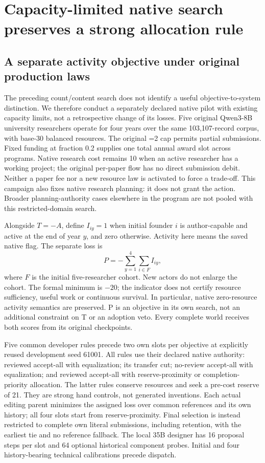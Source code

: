 \section{Capacity-limited native search preserves a strong allocation rule}
\label{sec:native-capacity}
\subsection{A separate activity objective under original production laws}
The preceding count/content search does not identify a useful objective-to-system
distinction. We therefore conduct a separately declared native pilot with
existing capacity limits, not a retrospective change of its losses. Five
original Qwen3-8B university researchers operate for four years over the same
103,107-record corpus, with base-30 balanced resources. The original
=2 cap permits partial submissions. Fixed funding
at fraction 0.2 supplies one total annual award slot across programs. Native
research cost remains 10 when an active researcher has a working project;
the original per-paper flow has no direct submission debit. Neither a paper
fee nor a new resource law is activated to force a trade-off.
This campaign also fixes native research planning: it does not grant the
 action. Broader planning-authority cases elsewhere in
the program are not pooled with this restricted-domain search.

Alongside $T=-A$, define $I_{iy}=1$ when initial founder $i$ is author-capable
and active at the end of year $y$, and zero otherwise. Activity here means
the saved native  flag. The separate loss is
\[
 P=-\sum_{y=1}^{4}\sum_{i\in F} I_{iy},
\]
where $F$ is the initial five-researcher cohort. New actors do not enlarge
the cohort. The formal minimum is $-20$; the indicator does not certify
resource sufficiency, useful work or continuous survival. In particular,
native zero-resource activity semantics are preserved. P is an objective
in its own search, not an additional constraint on T or an adoption veto.
Every complete world receives both scores from its original checkpoints.

Five common developer rules precede two own slots per objective at explicitly
reused development seed 61001. All rules use their declared native authority:
reviewed accept-all with equalization; its transfer cut; no-review accept-all
with equalization; and reviewed accept-all with reserve-proximity or
completion-priority allocation. The latter rules conserve resources and seek
a pre-cost reserve of 21. They are strong hand controls, not generated inventions.
Each actual editing parent minimizes the assigned loss over common references
and its own history; all four slots start from reserve-proximity. Final selection
is instead restricted to complete own literal submissions, including retention,
with the earliest tie and no reference fallback. The local 35B designer has
16 proposal steps per slot and 64 optional historical component probes.
Initial and four history-bearing technical calibrations precede dispatch.

